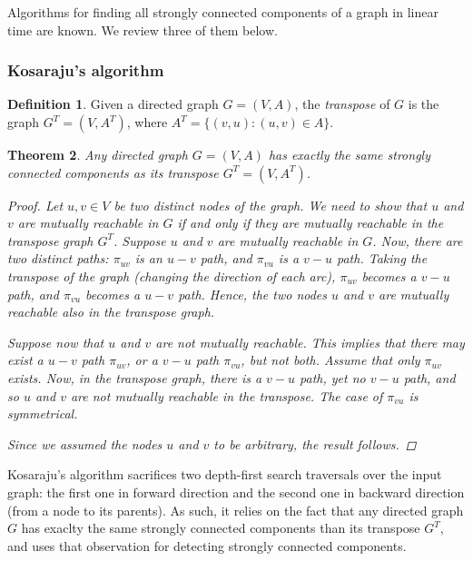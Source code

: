 \documentclass[english]{tktltiki2}
\newtheorem{mythm}{Theorem}[section]
\theoremstyle{definition}
\newtheorem{mydef}[mythm]{Definition}
\theoremstyle{remark}
\begin{document}
Algorithms for finding all strongly connected components of a graph in linear time are known. We review three of them below.

\subsubsection{Kosaraju's algorithm}

\begin{mydef}
Given a directed graph $G = (V, A)$, the \textit{transpose} of $G$ is the graph $G^T = (V, A^T)$, where $A^T = \{ (v, u) \colon (u, v) \in A \}$.
\end{mydef}

\begin{mythm}
Any directed graph $G = (V,A)$ has exactly the same strongly connected components as its transpose $G^T = (V, A^T)$.

\begin{proof}
Let $u, v \in V$ be two distinct nodes of the graph. We need to show that $u$ and $v$ are mutually reachable in $G$ if and only if they are mutually reachable in the transpose graph $G^T$. Suppose $u$ and $v$ are mutually reachable in $G$. Now, there are two distinct paths: $\pi_{uv}$ is an $u-v$ path, and $\pi_{vu}$ is a $v-u$ path. Taking the transpose of the graph (changing the direction of each arc), $\pi_{uv}$ becomes a $v-u$ path, and $\pi_{vu}$ becomes a $u-v$ path. Hence, the two nodes $u$ and $v$ are mutually reachable also in the transpose graph. 

Suppose now that $u$ and $v$ are not mutually reachable. This implies that there may exist a $u-v$ path $\pi_{uv}$, or a $v-u$ path $\pi_{vu}$, but not both. Assume that only $\pi_{uv}$ exists. Now, in the transpose graph, there is a $v-u$ path, yet no $v-u$ path, and so $u$ and $v$ are not mutually reachable in the transpose. The case of $\pi_{vu}$ is symmetrical. 

Since we assumed the nodes $u$ and $v$ to be arbitrary, the result follows.
\end{proof}
\end{mythm}

Kosaraju's algorithm sacrifices two depth-first search traversals over the input graph: the first one in forward direction and the second one in backward direction (from a node to its parents). As such, it relies on the fact that any directed graph $G$ has exaclty the same strongly connected components than its transpose $G^T$, and uses that observation for detecting strongly connected components.
\end{document}
